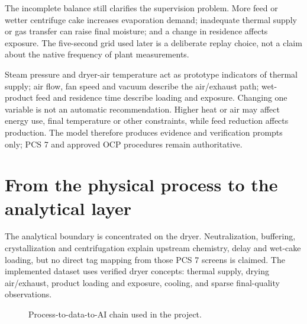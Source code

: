 The incomplete balance still clarifies the supervision problem. More feed or wetter centrifuge cake increases evaporation demand; inadequate thermal supply or gas transfer can raise final moisture; and a change in residence affects exposure. The five-second grid used later is a deliberate replay choice, not a claim about the native frequency of plant measurements.

Steam pressure and dryer-air temperature act as prototype indicators of thermal supply; air flow, fan speed and vacuum describe the air/exhaust path; wet-product feed and residence time describe loading and exposure. Changing one variable is not an automatic recommendation. Higher heat or air may affect energy use, final temperature or other constraints, while feed reduction affects production. The model therefore produces evidence and verification prompts only; PCS 7 and approved OCP procedures remain authoritative.

\section{From the physical process to the analytical layer}

The analytical boundary is concentrated on the dryer. Neutralization, buffering, crystallization and centrifugation explain upstream chemistry, delay and wet-cake loading, but no direct tag mapping from those PCS 7 screens is claimed. The implemented dataset uses verified dryer concepts: thermal supply, drying air/exhaust, product loading and exposure, cooling, and sparse final-quality observations.

\begin{figure}[htbp]
\centering
{}
\caption{Process-to-data-to-AI chain used in the project.}
\label{fig:process-data-ai}
\end{figure}

